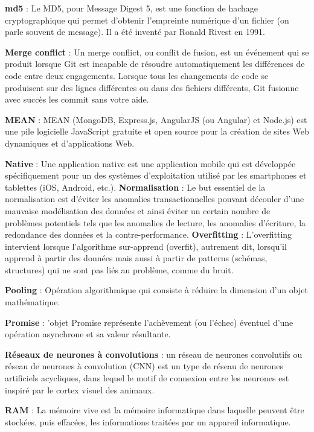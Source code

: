 \documentclass[oneside,a4paper,13pt]{article}
\begin{document}
\medbreak
\textbf{md5} : Le MD5, pour Message Digest 5, est une fonction de hachage cryptographique qui permet d'obtenir l'empreinte numérique d'un fichier (on parle souvent de message). Il a été inventé par Ronald Rivest en 1991.


\medbreak
\textbf{Merge conflict} : Un merge conflict, ou conflit de fusion, est un événement qui se produit lorsque Git est incapable de résoudre automatiquement les différences de code entre deux engagements. Lorsque tous les changements de code se produisent sur des lignes différentes ou dans des fichiers différents, Git fusionne avec succès les commit sans votre aide.

\medbreak
\textbf{MEAN} : MEAN (MongoDB, Express.js, AngularJS (ou Angular) et Node.js) est une pile logicielle JavaScript gratuite et open source pour la création de sites Web dynamiques et d'applications Web.

\medbreak
\textbf{Native} : Une application native est une application mobile qui est développée spécifiquement pour un des systèmes d'exploitation utilisé par les smartphones et tablettes (iOS, Android, etc.).
\medbreak
\textbf{Normalisation} : Le but essentiel de la normalisation est d’éviter les anomalies transactionnelles pouvant découler d’une mauvaise modélisation des données et ainsi éviter un certain nombre de problèmes potentiels tels que les anomalies de lecture, les anomalies d’écriture, la redondance des données et la contre-performance.
\medbreak
\textbf{Overfitting} : L’overfitting intervient lorsque l’algorithme sur-apprend (overfit), autrement dit, lorsqu’il apprend à partir des données mais aussi à partir de patterns (schémas, structures) qui ne sont pas liés au problème, comme du bruit.

\medbreak
\textbf{Pooling} : Opération algorithmique qui consiste à réduire la dimension d'un objet mathématique.
\medbreak

\medbreak
\textbf{Promise} : 'objet Promise représente l'achèvement (ou l'échec) éventuel d'une opération asynchrone et sa valeur résultante.

\textbf{Réseaux de neurones à convolutions} : un réseau de neurones convolutifs ou réseau de neurones à convolution (CNN) est un type de réseau de neurones artificiels acycliques, dans lequel le motif de connexion entre les neurones est inspiré par le cortex visuel des animaux.

\medbreak
\textbf{RAM} : La mémoire vive est la mémoire informatique dans laquelle peuvent être stockées, puis effacées, les informations traitées par un appareil informatique.
\end{document}
